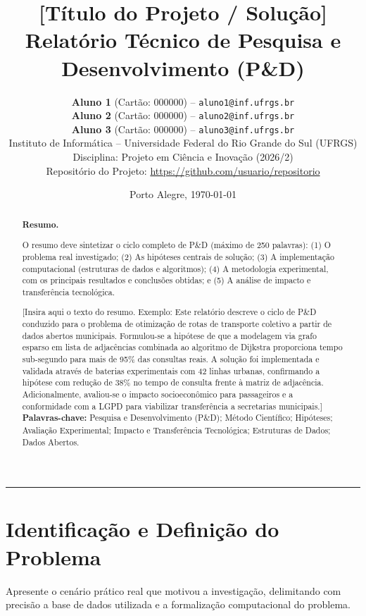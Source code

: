 \documentclass[11pt,a4paper]{article}
\title{
    \vspace{-1.0cm}
    \textbf{\Large [Título do Projeto / Solução]}\\[0.3cm]
    \large Relatório Técnico de Pesquisa e Desenvolvimento (P\&D)
}
\author{
    \textbf{Aluno 1} (Cartão: 000000) -- \texttt{aluno1@inf.ufrgs.br}\\
    \textbf{Aluno 2} (Cartão: 000000) -- \texttt{aluno2@inf.ufrgs.br}\\
    \textbf{Aluno 3} (Cartão: 000000) -- \texttt{aluno3@inf.ufrgs.br}\\[0.3cm]
    \normalsize Instituto de Informática -- Universidade Federal do Rio Grande do Sul (UFRGS)\\
    \normalsize Disciplina: Projeto em Ciência e Inovação (2026/2)\\
    \small Repositório do Projeto: \url{https://github.com/usuario/repositorio}
}
\date{Porto Alegre, \today}
\begin{document}
\maketitle
\thispagestyle{fancy}

\begin{abstract}
\noindent
\textbf{Resumo.} 
\begin{instrucao}
O resumo deve sintetizar o ciclo completo de P\&D (máximo de 250 palavras): (1) O problema real investigado; (2) As hipóteses centrais de solução; (3) A implementação computacional (estruturas de dados e algoritmos); (4) A metodologia experimental, com os principais resultados e conclusões obtidas; e (5) A análise de impacto e transferência tecnológica.
\end{instrucao}
[Insira aqui o texto do resumo. Exemplo: Este relatório descreve o ciclo de P\&D conduzido para o problema de otimização de rotas de transporte coletivo a partir de dados abertos municipais. Formulou-se a hipótese de que a modelagem via grafo esparso em lista de adjacências combinada ao algoritmo de Dijkstra proporciona tempo sub-segundo para mais de 95\% das consultas reais. A solução foi implementada e validada através de baterias experimentais com 42 linhas urbanas, confirmando a hipótese com redução de 38\% no tempo de consulta frente à matriz de adjacência. Adicionalmente, avaliou-se o impacto socioeconômico para passageiros e a conformidade com a LGPD para viabilizar transferência a secretarias municipais.]
\\[0.3cm]
\textbf{Palavras-chave:} Pesquisa e Desenvolvimento (P\&D); Método Científico; Hipóteses; Avaliação Experimental; Impacto e Transferência Tecnológica; Estruturas de Dados; Dados Abertos.
\end{abstract}

\vspace{0.3cm}
\hrule
\vspace{0.4cm}

\section{Identificação e Definição do Problema}

\begin{instrucao}
Apresente o cenário prático real que motivou a investigação, delimitando com precisão a base de dados utilizada e a formalização computacional do problema.
\end{instrucao}
\end{document}
